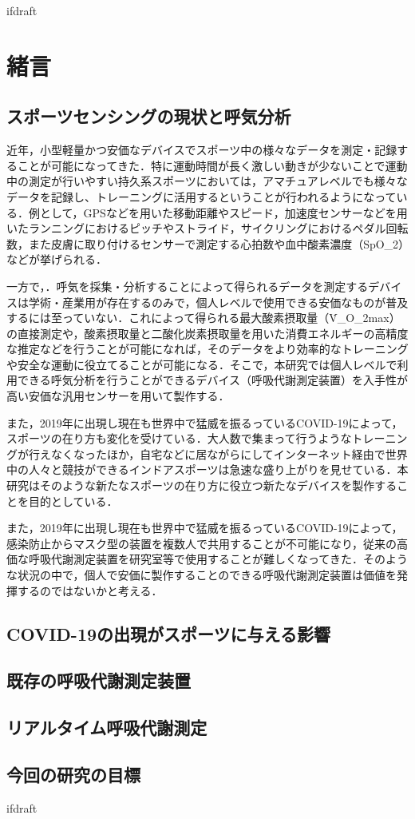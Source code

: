 \expandafter\ifx\csname ifdraft\endcsname\relax
 
\fi

\section{緒言}

\subsection{スポーツセンシングの現状と呼気分析}

近年，小型軽量かつ安価なデバイスでスポーツ中の様々なデータを測定・記録することが可能になってきた．特に運動時間が長く激しい動きが少ないことで運動中の測定が行いやすい持久系スポーツにおいては，アマチュアレベルでも様々なデータを記録し、トレーニングに活用するということが行われるようになっている．例として，GPSなどを用いた移動距離やスピード，加速度センサーなどを用いたランニングにおけるピッチやストライド，サイクリングにおけるペダル回転数，また皮膚に取り付けるセンサーで測定する心拍数や血中酸素濃度（SpO_2）などが挙げられる．

一方で，．呼気を採集・分析することによって得られるデータを測定するデバイスは学術・産業用が存在するのみで，個人レベルで使用できる安価なものが普及するには至っていない．これによって得られる最大酸素摂取量（\.{V}_{O_2max}）の直接測定や，酸素摂取量と二酸化炭素摂取量を用いた消費エネルギーの高精度な推定などを行うことが可能になれば，そのデータをより効率的なトレーニングや安全な運動に役立てることが可能になる．そこで，本研究では個人レベルで利用できる呼気分析を行うことができるデバイス（呼吸代謝測定装置）を入手性が高い安価な汎用センサーを用いて製作する．

また，2019年に出現し現在も世界中で猛威を振るっているCOVID-19によって，スポーツの在り方も変化を受けている．大人数で集まって行うようなトレーニングが行えなくなったほか，自宅などに居ながらにしてインターネット経由で世界中の人々と競技ができるインドアスポーツは急速な盛り上がりを見せている．本研究はそのような新たなスポーツの在り方に役立つ新たなデバイスを製作することを目的としている．

また，2019年に出現し現在も世界中で猛威を振るっているCOVID-19によって，感染防止からマスク型の装置を複数人で共用することが不可能になり，従来の高価な呼吸代謝測定装置を研究室等で使用することが難しくなってきた．そのような状況の中で，個人で安価に製作することのできる呼吸代謝測定装置は価値を発揮するのではないかと考える．

\subsection{COVID-19の出現がスポーツに与える影響}

\subsection{既存の呼吸代謝測定装置}

\subsection{リアルタイム呼吸代謝測定}

\subsection{今回の研究の目標}


\expandafter\ifx\csname ifdraft\endcsname\relax
  
\fi
